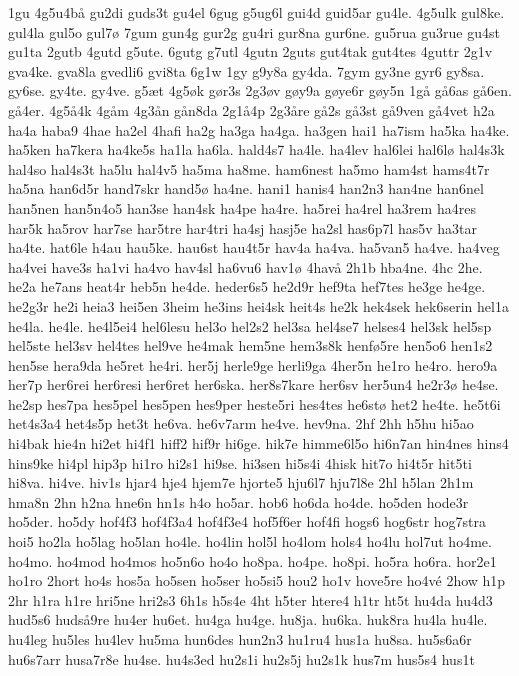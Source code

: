{1gu
4g5u4bå
gu2di
guds3t
gu4el
6gug
g5ug6l
gui4d
guid5ar
gu4le.
4g5ulk
gul8ke.
gul4la
gul5o
gul7ø
7gum
gun4g
gur2g
gu4ri
gur8na
gur6ne.
gu5rua
gu3rue
gu4st
gu1ta
2gutb
4gutd
g5ute.
6gutg
g7utl
4gutn
2guts
gut4tak
gut4tes
4guttr
2g1v
gva4ke.
gva8la
gvedli6
gvi8ta
6g1w
1gy
g9y8a
gy4da.
7gym
gy3ne
gyr6
gy8sa.
gy6se.
gy4te.
gy4ve.
g5æt
4g5øk
gør3s
2g3øv
gøy9a
gøye6r
gøy5n
1gå
gå6as
gå6en.
gå4er.
4g5å4k
4gåm
4g3ån
gån8da
2g1å4p
2g3åre
gå2s
gå3st
gå9ven
gå4vet
h2a
ha4a
haba9
4hae
ha2el
4hafi
ha2g
ha3ga
ha4ga.
ha3gen
hai1
ha7ism
ha5ka
ha4ke.
ha5ken
ha7kera
ha4ke5s
ha1la
ha6la.
hald4s7
ha4le.
ha4lev
hal6lei
hal6lø
hal4s3k
hal4so
hal4s3t
ha5lu
hal4v5
ha5ma
ha8me.
ham6nest
ha5mo
ham4st
hams4t7r
ha5na
han6d5r
hand7skr
hand5ø
ha4ne.
hani1
hanis4
han2n3
han4ne
han6nel
han5nen
han5n4o5
han3se
han4sk
ha4pe
ha4re.
ha5rei
ha4rel
ha3rem
ha4res
har5k
ha5rov
har7se
har5tre
har4tri
ha4sj
hasj5e
ha2sl
has6p7l
has5v
ha3tar
ha4te.
hat6le
h4au
hau5ke.
hau6st
hau4t5r
hav4a
ha4va.
ha5van5
ha4ve.
ha4veg
ha4vei
have3s
ha1vi
ha4vo
hav4sl
ha6vu6
hav1ø
4havå
2h1b
hba4ne.
4hc
2he.
he2a
he7ans
heat4r
heb5n
he4de.
heder6s5
he2d9r
hef9ta
hef7tes
he3ge
he4ge.
he2g3r
he2i
heia3
hei5en
3heim
he3ins
hei4sk
heit4s
he2k
hek4sek
hek6serin
hel1a
he4la.
he4le.
he4l5ei4
hel6lesu
hel3o
hel2s2
hel3sa
hel4se7
helses4
hel3sk
hel5sp
hel5ste
hel3sv
hel4tes
hel9ve
he4mak
hem5ne
hem3s8k
henfø5re
hen5o6
hen1s2
hen5se
hera9da
he5ret
he4ri.
her5j
herle9ge
herli9ga
4her5n
he1ro
he4ro.
hero9a
her7p
her6rei
her6resi
her6ret
her6ska.
her8s7kare
her6sv
her5un4
he2r3ø
he4se.
he2sp
hes7pa
hes5pel
hes5pen
hes9per
heste5ri
hes4tes
he6stø
het2
he4te.
he5t6i
het4s3a4
het4s5p
het3t
he6va.
he6v7arm
he4ve.
hev9na.
2hf
2hh
h5hu
hi5ao
hi4bak
hie4n
hi2et
hi4f1
hiff2
hif9r
hi6ge.
hik7e
himme6l5o
hi6n7an
hin4nes
hins4
hins9ke
hi4pl
hip3p
hi1ro
hi2s1
hi9se.
hi3sen
hi5s4i
4hisk
hit7o
hi4t5r
hit5ti
hi8va.
hi4ve.
hiv1s
hjar4
hje4
hjem7e
hjorte5
hju6l7
hju7l8e
2hl
h5lan
2h1m
hma8n
2hn
h2na
hne6n
hn1s
h4o
ho5ar.
hob6
ho6da
ho4de.
ho5den
hode3r
ho5der.
ho5dy
hof4f3
hof4f3a4
hof4f3e4
hof5f6er
hof4fi
hogs6
hog6str
hog7stra
hoi5
ho2la
ho5lag
ho5lan
ho4le.
ho4lin
hol5l
ho4lom
hols4
ho4lu
hol7ut
ho4me.
ho4mo.
ho4mod
ho4mos
ho5n6o
ho4o
ho8pa.
ho4pe.
ho8pi.
ho5ra
ho6ra.
hor2e1
ho1ro
2hort
ho4s
hos5a
ho5sen
ho5ser
ho5si5
hou2
ho1v
hove5re
ho4vé
2how
h1p
2hr
h1ra
h1re
hri5ne
hri2s3
6h1s
h5s4e
4ht
h5ter
htere4
h1tr
ht5t
hu4da
hu4d3
hud5s6
hudså9re
hu4er
hu6et.
hu4ga
hu4ge.
hu8ja.
hu6ka.
huk8ra
hu4la
hu4le.
hu4leg
hu5les
hu4lev
hu5ma
hun6des
hun2n3
hu1ru4
hus1a
hu8sa.
hu5s6a6r
hu6s7arr
husa7r8e
hu4se.
hu4s3ed
hu2s1i
hu2s5j
hu2s1k
hus7m
hus5s4
hus1t
}
